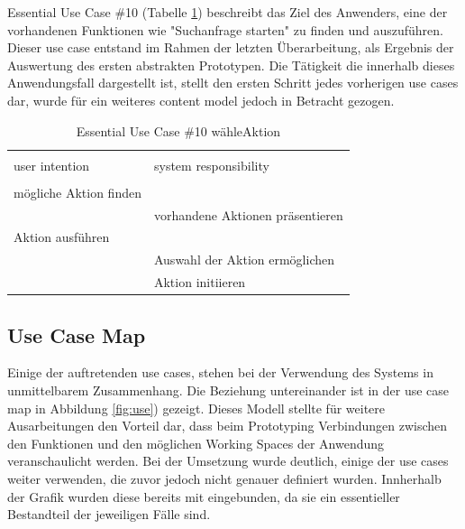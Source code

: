 Essential Use Case \#10 (Tabelle \ref{tab:aktionen}) beschreibt das Ziel des Anwenders, eine der vorhandenen Funktionen wie  "Suchanfrage starten" zu finden und auszuführen. Dieser use case entstand im Rahmen der letzten Überarbeitung, als Ergebnis der Auswertung des ersten abstrakten Prototypen. Die Tätigkeit die innerhalb dieses Anwendungsfall dargestellt ist, stellt den ersten Schritt jedes vorherigen use cases dar, wurde für ein weiteres content model jedoch in Betracht gezogen.

\begin{table}[H]
\caption{Essential Use Case \#10 wähleAktion }
\centering
\begin{tabular}{l l}
\\ [-0.5ex]

\hline\hline
\\ [-0.5ex]
user intention & system responsibility
\\ [1.5ex]
\hline
\\ [-0.5ex]
mögliche Aktion finden        &                                \\[1ex]
                        & vorhandene Aktionen präsentieren        \\[1ex]
Aktion ausführen           &                                \\[1ex] 
                        & Auswahl der Aktion ermöglichen       \\[1ex]
                        & Aktion initiieren                    \\[1ex]
\hline
\end{tabular}
\label{tab:aktionen}
\end{table}

\newpage
\subsection{Use Case Map}
Einige der auftretenden use cases, stehen bei der Verwendung des Systems in unmittelbarem Zusammenhang. Die Beziehung untereinander ist in der use case map in Abbildung \ref{fig:use}) gezeigt. Dieses Modell stellte für weitere Ausarbeitungen den Vorteil dar, dass beim Prototyping Verbindungen zwischen den Funktionen und den möglichen Working Spaces der Anwendung veranschaulicht werden. Bei der Umsetzung wurde deutlich, einige der use cases weiter verwenden, die zuvor jedoch nicht genauer definiert wurden. Innherhalb der Grafik wurden diese bereits mit eingebunden, da sie ein essentieller Bestandteil der jeweiligen Fälle sind.

